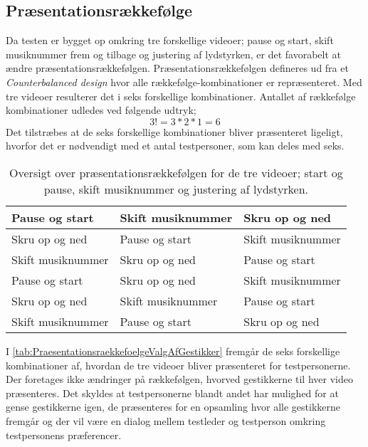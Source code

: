 \subsection{Præsentationsrækkefølge}
\label{PraesentationsraekkefoelgeValgAfGestikker}
%
Da testen er bygget op omkring tre forskellige videoer; pause og start, skift musiknummer frem og tilbage og justering af lydstyrken, er det favorabelt at ændre præsentationsrækkefølgen. Præsentationsrækkefølgen defineres ud fra et \textit{Counterbalanced design} hvor alle rækkefølge-kombinationer er repræsenteret. Med tre videoer resulterer det i seks forskellige kombinationer. Antallet af rækkefølge kombinationer udledes ved følgende udtryk;
%
\begin{equation}
	3! = 3*2*1 = 6
\end{equation}
%
Det tilstræbes at de seks forskellige kombinationer bliver præsenteret ligeligt, hvorfor det er nødvendigt med et antal testpersoner, som kan deles med seks.
%
\begin{table}[H]
	\centering
	\begin{tabular}{ |  p{4cm}  |  p{4cm}  |  p{4cm}  |}
		\hline
		Pause og start & Skift musiknummer & Skru op og ned \\ \hline
		Skru op og ned & Pause og start & Skift musiknummer\\ \hline
		Skift musiknummer & Skru op og ned & Pause og start \\ \hline
		Pause og start & Skru op og ned & Skift musiknummer\\ \hline
		Skru op og ned & Skift musiknummer & Pause og start\\ \hline
		Skift musiknummer & Pause og start & Skru op og ned \\ \hline
	\end{tabular}
	\caption{Oversigt over præsentationsrækkefølgen for de tre videoer; start og pause, skift musiknummer og justering af lydstyrken.}
	\label{tab:PraesentationsraekkefoelgeValgAfGestikker}
\end{table}
\noindent
%
I \autoref{tab:PraesentationsraekkefoelgeValgAfGestikker} fremgår de seks forskellige kombinationer af, hvordan de tre videoer bliver præsenteret for testpersonerne. Der foretages ikke ændringer på rækkefølgen, hvorved gestikkerne til hver video præsenteres. Det skyldes at testpersonerne blandt andet har mulighed for at gense gestikkerne igen, de præsenteres for en opsamling hvor alle gestikkerne fremgår og der vil være en dialog mellem testleder og testperson omkring testpersonens præferencer.  
%
